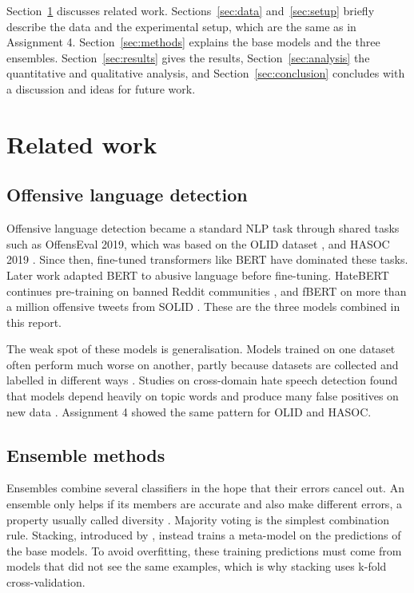 \documentclass[11pt,a4paper]{article}
\begin{document}
Section~\ref{sec:related} discusses related work. Sections~\ref{sec:data} and~\ref{sec:setup} briefly describe the data and the experimental setup, which are the same as in Assignment 4. Section~\ref{sec:methods} explains the base models and the three ensembles. Section~\ref{sec:results} gives the results, Section~\ref{sec:analysis} the quantitative and qualitative analysis, and Section~\ref{sec:conclusion} concludes with a discussion and ideas for future work.

\section{Related work}
\label{sec:related}

\subsection{Offensive language detection}

Offensive language detection became a standard NLP task through shared tasks such as OffensEval 2019, which was based on the OLID dataset \citep{zampieri2019olid}, and HASOC 2019 \citep{mandl2019hasoc}. Since then, fine-tuned transformers like BERT \citep{devlin2019bert} have dominated these tasks. Later work adapted BERT to abusive language before fine-tuning. HateBERT continues pre-training on banned Reddit communities \citep{caselli2021hatebert}, and fBERT on more than a million offensive tweets from SOLID \citep{sarkar2021fbert}. These are the three models combined in this report.

The weak spot of these models is generalisation. Models trained on one dataset often perform much worse on another, partly because datasets are collected and labelled in different ways \citep{fortuna2021how}. Studies on cross-domain hate speech detection found that models depend heavily on topic words and produce many false positives on new data \citep{markov2021improving}. Assignment 4 showed the same pattern for OLID and HASOC.

\subsection{Ensemble methods}

Ensembles combine several classifiers in the hope that their errors cancel out. An ensemble only helps if its members are accurate and also make different errors, a property usually called diversity \citep{kuncheva2003measures}. Majority voting is the simplest combination rule. Stacking, introduced by \citet{wolpert1992stacked}, instead trains a meta-model on the predictions of the base models. To avoid overfitting, these training predictions must come from models that did not see the same examples, which is why stacking uses k-fold cross-validation.
\end{document}

